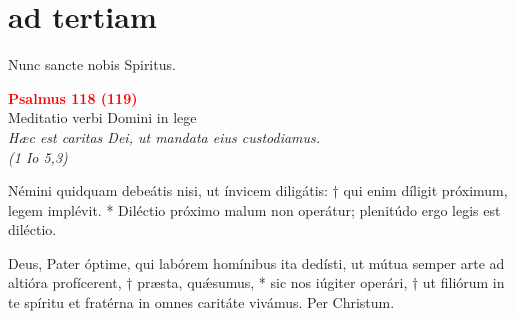 
\vspace{0.6cm}

\def\greinitialformat#1{{\fontsize{40}{40}\selectfont #1}}
\gresetfirstlineaboveinitial{\small \textcolor{red}{Benedic.}}{}
\setaboveinitialseparation{0.72mm}





\section[horae minores]{ad tertiam}

 Nunc sancte nobis Spiritus.

\begin{center}
 \textcolor{red}{\large \bf Psalmus 118 (119)}\\
Meditatio verbi Domini in lege\\
\textit{\small Hæc est caritas Dei, ut mandata eius custodiamus.\\(1 Io 5,3)}
\end{center}

\def\greinitialformat#1{{\fontsize{40}{40}\selectfont #1}}
\gresetfirstlineaboveinitial{\small \textcolor{red}{ xi - xiii }}{}
\setaboveinitialseparation{0.72mm}



\vspace{0.3cm}
Némini quidquam debeátis nisi, ut ínvicem diligátis: † qui enim díligit próximum, legem implévit. * 
Diléctio próximo malum non operátur; plenitúdo ergo legis est diléctio.\\


Deus, Pater óptime, qui labórem homínibus ita dedísti, ut mútua semper arte ad altióra profícerent, † 
præsta, quǽsumus, * sic nos iúgiter operári, † ut filiórum in te spíritu et fratérna in omnes caritáte vivámus. Per Christum.\\

